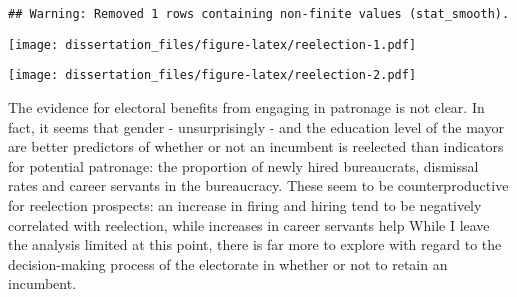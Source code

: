 \documentclass[12pt,]{book}
\newenvironment{Shaded}{\begin{snugshade}}{\end{snugshade}}
\newcommand{\CommentTok}[1]{\textcolor[rgb]{0.56,0.35,0.01}{\textit{#1}}}
\newcommand{\DataTypeTok}[1]{\textcolor[rgb]{0.13,0.29,0.53}{#1}}
\newcommand{\KeywordTok}[1]{\textcolor[rgb]{0.13,0.29,0.53}{\textbf{#1}}}
\newcommand{\NormalTok}[1]{#1}
\newcommand{\OperatorTok}[1]{\textcolor[rgb]{0.81,0.36,0.00}{\textbf{#1}}}
\newcommand{\StringTok}[1]{\textcolor[rgb]{0.31,0.60,0.02}{#1}}
\begin{document}
\begin{verbatim}
## Warning: Removed 1 rows containing non-finite values (stat_smooth).
\end{verbatim}

\texttt{[image: dissertation\_files/figure-latex/reelection-1.pdf]}

\begin{Shaded}
\end{Shaded}

\texttt{[image: dissertation\_files/figure-latex/reelection-2.pdf]}

The evidence for electoral benefits from engaging in patronage is not clear. In fact, it seems that gender - unsurprisingly - and the education level of the mayor are better predictors of whether or not an incumbent is reelected than indicators for potential patronage: the proportion of newly hired bureaucrats, dismissal rates and career servants in the bureaucracy. These seem to be counterproductive for reelection prospects: an increase in firing and hiring tend to be negatively correlated with reelection, while increases in career servants help While I leave the analysis limited at this point, there is far more to explore with regard to the decision-making process of the electorate in whether or not to retain an incumbent.
\end{document}
